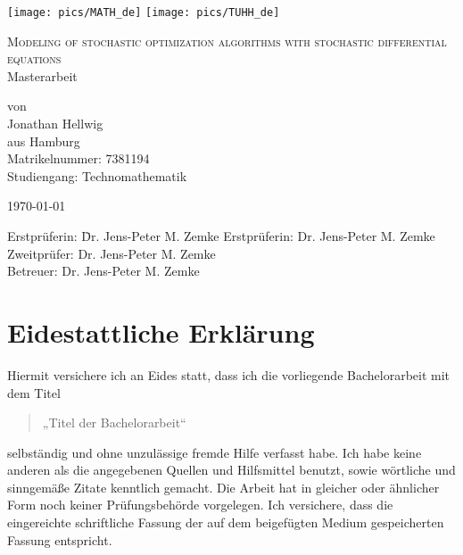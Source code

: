 \documentclass[12pt]{article}
\theoremstyle{definition}
\numberwithin{equation}{section}
\begin{document}
\thispagestyle{empty}

\begin{center}
  \texttt{[image: pics/MATH\_de]}
  \hfill
  \texttt{[image: pics/TUHH\_de]}
\end{center}

\vspace*{5em}

\begin{center}
  {\Huge
    \textsc{Modeling of stochastic optimization algorithms with stochastic differential equations}\\[2em]
  }
  {\LARGE
    Masterarbeit
  }

  \vspace*{2em}

  {\Large
    von\\
    Jonathan Hellwig\\
    aus Hamburg\\
    Matrikelnummer: 7381194\\
    Studiengang: Technomathematik\\
  }
\end{center}

\vfill
\begin{center}
  \today
\end{center}
\vfill

\begin{tabbing}
  Erstprüferin: \= Dr. Jens-Peter M. Zemke\kill
  Erstprüferin: \> Dr. Jens-Peter M. Zemke\\
  Zweitprüfer:  \> Dr. Jens-Peter M. Zemke\\
  Betreuer:     \> Dr. Jens-Peter M. Zemke\\
\end{tabbing}
\newpage
\thispagestyle{empty}
\mbox{}
\newpage

\section*{Eidestattliche Erklärung}

Hiermit versichere ich an Eides statt, dass ich die vorliegende
Bachelorarbeit mit dem Titel
\begin{quote}
  „Titel der Bachelorarbeit“  
\end{quote}
selbständig und ohne unzulässige fremde Hilfe verfasst habe. Ich habe
keine anderen als die angegebenen Quellen und Hilfsmittel benutzt,
sowie wörtliche und sinngemäße Zitate kenntlich gemacht. Die Arbeit
hat in gleicher oder ähnlicher Form noch keiner Prüfungsbehörde
vorgelegen. Ich versichere, dass die eingereichte schriftliche Fassung
der auf dem beigefügten Medium gespeicherten Fassung entspricht.
\end{document}
